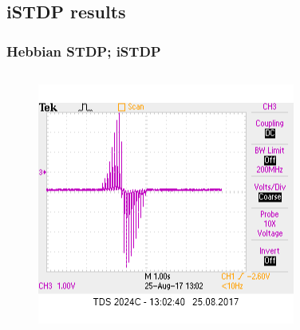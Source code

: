 \documentclass[12pt, aspectratio=169]{beamer}
\begin{document}
\subsection{iSTDP results}

\begin{frame}
\frametitle{Hebbian STDP; iSTDP}
\begin{columns}[c] %

\begin{figure}
\includegraphics[width=1\linewidth]{hebb_output_single}
\end{figure}
\begin{figure}

\end{figure}
\end{columns}
\end{frame}
\end{document}
